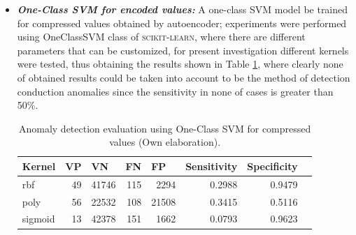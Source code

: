 \begin{itemize}
\item \textbf{\textit{One-Class SVM for encoded values: }}A one-class SVM model be trained for compressed values obtained by autoencoder; experiments were performed using OneClassSVM class of \textsc{scikit-learn}, where there are different parameters that can be customized, for present investigation different kernels were tested, thus obtaining the results shown in Table \ref{table:evaluacion_SVM_encoded}, where clearly none of obtained results could be taken into account to be the method of detection conduction anomalies since the sensitivity in none of cases is greater than 50\%.

\begin{table}[H]
\centering
\begin{center}
\begin{tabular}{|l|r|r|r|r|r|r|r|}
\hline
\textbf{Kernel} & \multicolumn{1}{l|}{\textbf{VP}} & \multicolumn{1}{l|}{\textbf{VN}}& \multicolumn{1}{l|}{\textbf{FN}}& \multicolumn{1}{l|}{\textbf{FP}} & \multicolumn{1}{l|}{\textbf{Sensitivity}} & \multicolumn{1}{l|}{\textbf{Specificity}} \\ \hline
rbf & \cellcolor[HTML]{AADD99} 49 & \cellcolor[HTML]{AADD99} 41746 & \cellcolor[HTML]{FFCE93} 115 & \cellcolor[HTML]{FFCE93} 2294 & 0.2988 & 0.9479 \\ \hline
poly & \cellcolor[HTML]{AADD99} 56 & \cellcolor[HTML]{AADD99} 22532 & \cellcolor[HTML]{FFCE93} 108 & \cellcolor[HTML]{FFCE93} 21508 & 0.3415 & 0.5116 \\ \hline
sigmoid & \cellcolor[HTML]{AADD99} 13 & \cellcolor[HTML]{AADD99} 42378 & \cellcolor[HTML]{FFCE93} 151 & \cellcolor[HTML]{FFCE93} 1662 & 0.0793 & 0.9623 \\ \hline
\end{tabular}
\end{center}
\caption{Anomaly detection evaluation using One-Class SVM for compressed values (Own elaboration).}
\label{table:evaluacion_SVM_encoded}
\end{table}


\end{itemize}
